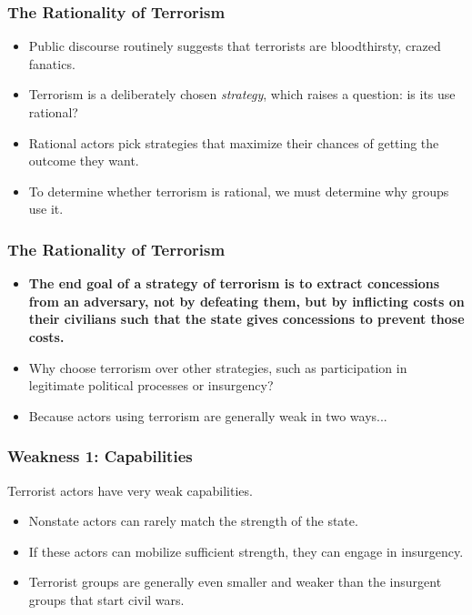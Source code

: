 \documentclass[handout]{beamer}
\begin{document}
\begin{frame} 
\frametitle{\LARGE{The Rationality of Terrorism}}
\begin{itemize}
	    \item Public discourse routinely suggests that terrorists are bloodthirsty, crazed fanatics. \pause 
	    \item Terrorism is a deliberately chosen \textit{strategy}, which raises a question: is its use rational? \pause
		\item Rational actors pick strategies that maximize their chances of getting the outcome they want. \pause 
		\item To determine whether terrorism is rational, we must determine why groups use it.
\end{itemize}
\end{frame}

\begin{frame} 
	\frametitle{\LARGE{The Rationality of Terrorism}}
	\begin{itemize}
		\item \textbf{The end goal of a strategy of terrorism is to extract concessions from an adversary, not by defeating them, but by inflicting costs on their civilians such that the state gives concessions to prevent those costs.} \pause
		\item Why choose terrorism over other strategies, such as participation in legitimate political processes or insurgency? \pause
		\item Because actors using terrorism are generally weak in two ways...
	\end{itemize}
\end{frame}


\begin{frame} 
\frametitle{\LARGE{Weakness 1: Capabilities}}
Terrorist actors have very weak capabilities. \pause
\begin{itemize}
		\item Nonstate actors can rarely match the strength of the state. \pause 
		\item If these actors can mobilize sufficient strength, they can engage in insurgency. \pause 
		\item Terrorist groups are generally even smaller and weaker than the insurgent groups that start civil wars.
\end{itemize}
\end{frame}
\end{document}

